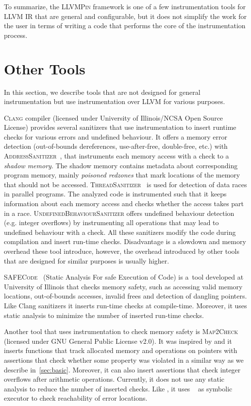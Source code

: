 To summarize, the \textsc{LLVMPin} framework is one of a few instrumentation
tools for LLVM IR that are general and configurable, but it does not simplify
the work for the user in terms of writing a code that performs the core of the
instrumentation process.

\section{Other Tools}

In this section, we describe tools that are not designed for general
instrumentation but use instrumentation over LLVM for various purposes.

\textsc{Clang} compiler (licensed under University of Illinois/NCSA Open Source
License) provides several sanitizers that use instrumentation to insert runtime
checks for various errors and undefined behaviour. It offers a memory error
detection (out-of-bounds dereferences, use-after-free, double-free, etc.) with
\textsc{AddressSanitizer}~\cite{asan}, that instruments each memory access with
a check to a \textit{shadow memory}. The shadow memory contains metadata about
corresponding program memory, mainly \textit{poisoned redzones} that mark
locations of the memory that should not be accessed.
\textsc{ThreadSanitizer}~\cite{tsan} is used for detection of data races in
parallel programs. The analyzed code is instrumented such that it keeps
information about each memory access and checks whether the access takes part
in a race.  \textsc{UndefinedBehaviourSanitizer} offers undefined behaviour
detection (e.g. integer overflows) by instrumenting all operations that may
lead to undefined behaviour with a check. All these sanitizers modify the code
during compilation and insert run-time checks. Disadvantage is a slowdown and
memory overhead these tool introduce, however, the overhead introduced by other
tools that are designed for similar purposes is usually higher.

\textsc{SAFECode}~\cite{safecode} (Static Analysis For safe Execution of Code)
is a~tool developed at University of Illinois that checks memory safety, such
as accessing valid memory locations, out-of-bounds accesses, invalid frees and
detection of dangling pointers. Like Clang sanitizers it inserts run-time
checks at compile-time. Moreover, it uses static analysis to minimize the
number of inserted run-time checks.

Another tool that uses instrumentation to check memory safety is
\textsc{Map2Check}~\cite{map2check} (licensed under GNU General Public License
v2.0). It was inspired by \symbiotic and it inserts functions that track
allocated memory and operations on pointers with assertions that check whether
some property was violated in a similar way as we describe in~\ref{sec:basic}.
Moreover, it can also insert assertions that check integer overflows after
arithmetic operations. Currently, it does not use any static analysis to reduce
the number of inserted checks. Like \symbiotic, it uses \klee~\cite{klee} as
symbolic executor to check reachability of error locations.

